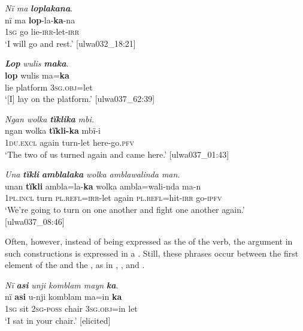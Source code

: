 \ea%
    \label{ex:phrase:90}
          \textit{Nï ma} \textbf{\textit{loplakana}}.\\
\gll nï    ma  \textbf{lop}{}-la-\textbf{ka}{}-na\\
    1\textsc{sg}  go  lie-\textsc{irr}{}-let-\textsc{irr}\\
\glt `I will go and rest.’ [ulwa032\_18:21]
\z

\ea%
    \label{ex:phrase:91}
          \textbf{\textit{Lop}} \textit{wulis} \textbf{\textit{maka}}.\\
\gll \textbf{lop}  wulis    ma=\textbf{ka}\\
    lie  platform  3\textsc{sg.obj}=let \\
\glt    ‘[I] lay on the platform.’ [ulwa037\_62:39]
\z

\ea%
    \label{ex:phrase:92}
          \textit{Ngan wolka} \textbf{\textit{tïklika}} \textit{mbi.}\\
\gll    ngan    wolka  \textbf{tïkli-ka}  mbï-i\\
    1\textsc{du.excl}  again  turn-let    here-go.\textsc{pfv}\\
\glt `The two of us turned again and came here.’ [ulwa037\_01:43]
\z

\ea%
    \label{ex:phrase:93}
          \textit{Una} \textbf{\textit{tïkli}} \textbf{\textit{amblalaka}} \textit{wolka amblawalinda man.}\\
\gll    unan    \textbf{tïkli}  ambla=la-\textbf{ka}    wolka  ambla=wali-nda ma-n\\
    1\textsc{pl.incl}  turn  \textsc{pl.refl=irr}{}-let  again  \textsc{pl.refl}=hit-\textsc{irr}    go-\textsc{ipfv}\\
\glt `We’re going to turn on one another and fight one another again.’ [ulwa037\_08:46]
\z

Often, however, instead of being expressed as the  of the verb, the  argument in such constructions is expressed in a . Still, these phrases occur between the first element of the  and the , as in , , and .

\ea%
    \label{ex:phrase:94}
          \textit{Nï} \textbf{\textit{asi}} \textit{unji komblam mayn} \textbf{\textit{ka}}.\\
\gll nï    \textbf{asi}  u-nji    komblam  ma=in      \textbf{ka}\\
    1\textsc{sg}  sit  2\textsc{sg-poss}  chair    3\textsc{sg.obj}=in  let\\
\glt `I sat in your chair.’ [elicited]
\z


